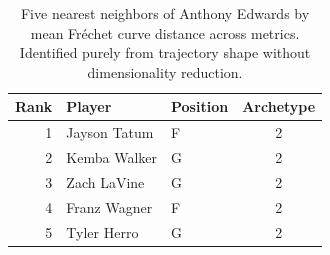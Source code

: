 \begin{table}[htbp]
  \centering\small
  \begin{tabular}{rllc}
    \toprule
    Rank & Player & Position & Archetype \\
    \midrule
    1 & Jayson Tatum & F & 2 \\
    2 & Kemba Walker & G & 2 \\
    3 & Zach LaVine & G & 2 \\
    4 & Franz Wagner & F & 2 \\
    5 & Tyler Herro & G & 2 \\
    \bottomrule
  \end{tabular}
  \caption{Five nearest neighbors of Anthony Edwards by mean Fr\'{e}chet curve distance across metrics. Identified purely from trajectory shape without dimensionality reduction.}
  \label{tab:Anthony_Edwards_frechet_curve_neighbors}
\end{table}

